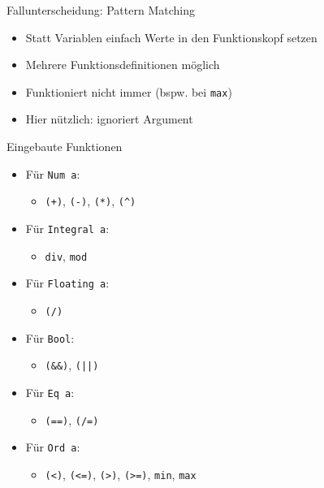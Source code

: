 \documentclass{beamer}
\newcommand{\code}[1]{
	\begin{mdframed}
		
	\end{mdframed}
}
\begin{document}
\begin{frame}{Fallunterscheidung: Pattern Matching}
	\code{demos/Bool.hs}

	\begin{itemize}
		\item Statt Variablen einfach Werte in den Funktionskopf setzen
		\item Mehrere Funktionsdefinitionen möglich
		\item Funktioniert nicht immer (bspw. bei \texttt{max})
		\item Hier nützlich: \texttt{\textunderscore} ignoriert Argument
	\end{itemize}
\end{frame}

\begin{frame}{Eingebaute Funktionen}
	\begin{itemize}
		\item Für \texttt{Num a}:
		\begin{itemize}
			\item \texttt{(+)}, \texttt{(-)}, \texttt{(*)}, \texttt{(\textasciicircum)}
		\end{itemize}
		\item Für \texttt{Integral a}:
		\begin{itemize}
			\item \texttt{div}, \texttt{mod}
		\end{itemize}
		\item Für \texttt{Floating a}:
		\begin{itemize}
			\item \texttt{(/)}
		\end{itemize}
		\item Für \texttt{Bool}:
		\begin{itemize}
			\item \texttt{(\&\&)}, \texttt{(||)}
		\end{itemize}
		\item Für \texttt{Eq a}:
		\begin{itemize}
			\item \texttt{(==)}, \texttt{(/=)}
		\end{itemize}
		\item Für \texttt{Ord a}:
		\begin{itemize}
			\item \texttt{(<)}, \texttt{(<=)}, \texttt{(>)}, \texttt{(>=)}, \texttt{min}, \texttt{max}
		\end{itemize}
	\end{itemize}
\end{frame}
\end{document}
